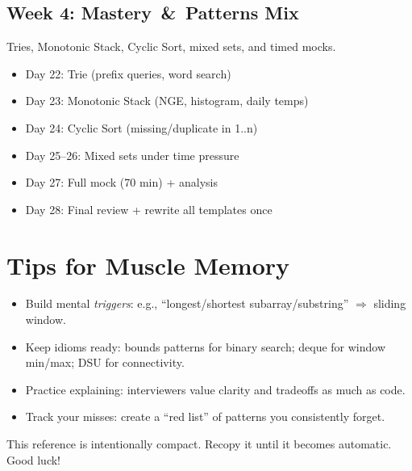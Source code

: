 \documentclass[11pt]{article}
\begin{document}
\subsection*{Week 4: Mastery \,\& \,Patterns Mix}
Tries, Monotonic Stack, Cyclic Sort, mixed sets, and timed mocks.
\begin{itemize}[leftmargin=1.2em]
  \item Day 22: Trie (prefix queries, word search)
  \item Day 23: Monotonic Stack (NGE, histogram, daily temps)
  \item Day 24: Cyclic Sort (missing/duplicate in 1..n)
  \item Day 25--26: Mixed sets under time pressure
  \item Day 27: Full mock (70 min) + analysis
  \item Day 28: Final review + rewrite all templates once
\end{itemize}

\section{Tips for Muscle Memory}
\begin{itemize}[leftmargin=1.2em]
  \item Build mental \emph{triggers}: e.g., ``longest/shortest subarray/substring'' $\Rightarrow$ sliding window.
  \item Keep idioms ready: bounds patterns for binary search; deque for window min/max; DSU for connectivity.
  \item Practice explaining: interviewers value clarity and tradeoffs as much as code.
  \item Track your misses: create a ``red list'' of patterns you consistently forget.
\end{itemize}

\vfill
\begin{center}
  {\small This reference is intentionally compact. Recopy it until it becomes automatic. Good luck!}
\end{center}
\end{document}
